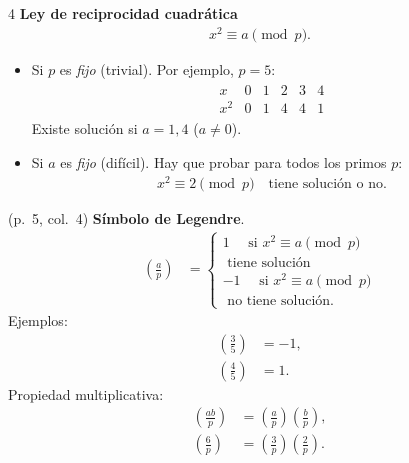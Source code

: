 \documentclass[landscape,a4paper]{article}
\begin{document}
\begin{multicols}{4}
  \noindent \textbf{Ley de reciprocidad cuadrática}\\
\begin{align*}
x^2 \equiv a \pmod{p}.
\end{align*}
\begin{itemize}
  \item Si $p$ es \emph{fijo} (trivial). Por ejemplo, $p=5$:
  \begin{align*}
  \begin{array}{c|ccccc}
    x & 0 & 1 & 2 & 3 & 4 \\ \hline
    x^2 & 0 & 1 & 4 & 4 & 1
  \end{array}
  \end{align*}
  Existe solución si $a = 1,4$ ($a\neq 0$).
  \item Si $a$ es \emph{fijo} (difícil). Hay que probar para todos los primos $p$:
  \begin{align*}
  x^2 \equiv 2 \pmod{p} 
  \quad\text{tiene solución o no.}
  \end{align*}
\end{itemize}
(p.~5, col.~4)
\noindent \textbf{Símbolo de Legendre}.\\
\begin{align*}
\left(\frac{a}{p}\right) &= 
  \begin{cases}
     1 \quad \text{ si } x^2 \equiv a \pmod{p}\\ \text{ tiene solución}\\
    -1 \quad \text{ si } x^2 \equiv a \pmod{p}\\ \text{ no tiene solución}.
  \end{cases}
\end{align*}
\noindent Ejemplos:
\begin{align*}
  \left(\frac{3}{5}\right) &= -1,\\
  \left(\frac{4}{5}\right) &=  1.
\end{align*}
\noindent Propiedad multiplicativa:
\begin{align*}
  \left(\frac{ab}{p}\right) &= \left(\frac{a}{p}\right)\left(\frac{b}{p}\right), \\
  \left(\frac{6}{p}\right)  &= \left(\frac{3}{p}\right)\left(\frac{2}{p}\right).
\end{align*}
\begin{tcolorbox}[colback=white,colframe=red!80!black,colbacktitle=red!80!black,
                  coltitle=white,title={Teorema:Criterio de Eisenstein (p.~6, col.~2)}]

\end{tcolorbox}
\end{multicols}
\end{document}
